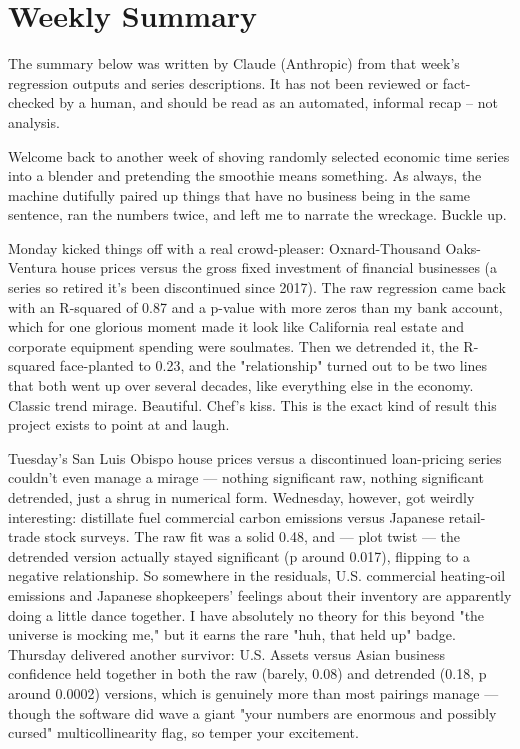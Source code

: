 \section{Weekly Summary}

\begin{tcolorbox}[colback=yellow!10,colframe=black!50,title=AI-Generated Content]
\noindent The summary below was written by Claude (Anthropic) from that week's regression outputs and series descriptions. It has not been reviewed or fact-checked by a human, and should be read as an automated, informal recap -- not analysis.
\end{tcolorbox}

Welcome back to another week of shoving randomly selected economic time series into a blender and pretending the smoothie means something. As always, the machine dutifully paired up things that have no business being in the same sentence, ran the numbers twice, and left me to narrate the wreckage. Buckle up.

Monday kicked things off with a real crowd-pleaser: Oxnard-Thousand Oaks-Ventura house prices versus the gross fixed investment of financial businesses (a series so retired it's been discontinued since 2017). The raw regression came back with an R-squared of 0.87 and a p-value with more zeros than my bank account, which for one glorious moment made it look like California real estate and corporate equipment spending were soulmates. Then we detrended it, the R-squared face-planted to 0.23, and the "relationship" turned out to be two lines that both went up over several decades, like everything else in the economy. Classic trend mirage. Beautiful. Chef's kiss. This is the exact kind of result this project exists to point at and laugh.

Tuesday's San Luis Obispo house prices versus a discontinued loan-pricing series couldn't even manage a mirage — nothing significant raw, nothing significant detrended, just a shrug in numerical form. Wednesday, however, got weirdly interesting: distillate fuel commercial carbon emissions versus Japanese retail-trade stock surveys. The raw fit was a solid 0.48, and — plot twist — the detrended version actually stayed significant (p around 0.017), flipping to a negative relationship. So somewhere in the residuals, U.S. commercial heating-oil emissions and Japanese shopkeepers' feelings about their inventory are apparently doing a little dance together. I have absolutely no theory for this beyond "the universe is mocking me," but it earns the rare "huh, that held up" badge. Thursday delivered another survivor: U.S. Assets versus Asian business confidence held together in both the raw (barely, 0.08) and detrended (0.18, p around 0.0002) versions, which is genuinely more than most pairings manage — though the software did wave a giant "your numbers are enormous and possibly cursed" multicollinearity flag, so temper your excitement.


